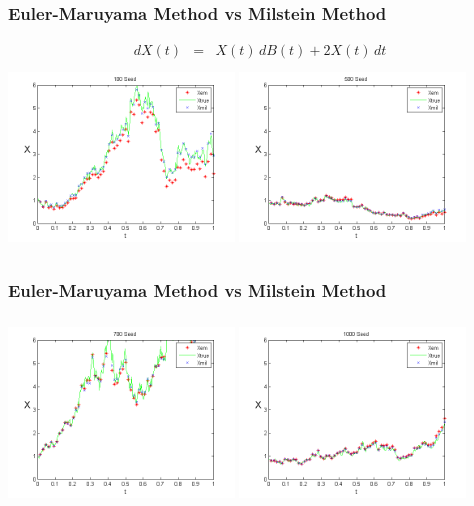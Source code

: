 \documentclass{beamer}   %
\begin{document}
\begin{frame}
  \frametitle{Euler-Maruyama Method vs Milstein Method}
  \vspace{-10mm}	
  \begin{eqnarray*}
		dX(t) &=&  X(t) \,dB(t)+ 2 X(t) \,dt
\end{eqnarray*}
\includegraphics[height=5cm,width=6cm]{emmil_seed100}
\includegraphics[height=5cm,width=6cm]{emmil_seed500}
\end{frame}


\begin{frame}
    \frametitle{Euler-Maruyama Method vs Milstein Method}
\includegraphics[height=5cm,width=6cm]{emmil_seed700}
\includegraphics[height=5cm,width=6cm]{emmil_seed1000}
\end{frame}
\end{document}
